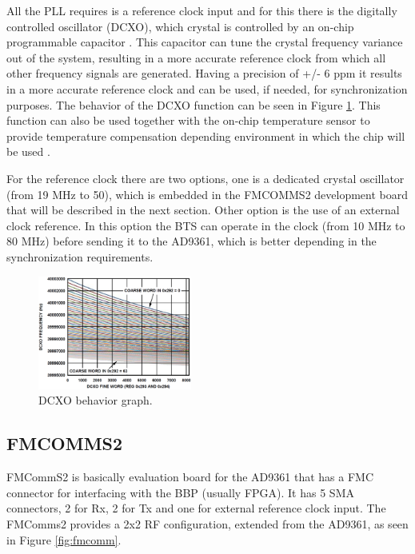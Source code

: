 All the PLL requires is a reference clock input and for this there is the
digitally controlled oscillator (DCXO), which crystal is controlled by an
on-chip programmable capacitor \cite{web:ad9361wiki}. This capacitor can tune
the crystal frequency variance out of the system, resulting in a more accurate
reference clock from which all other frequency signals are generated. Having a
precision of +/- 6 ppm it results in a more accurate reference clock and can be
used, if needed, for synchronization purposes. The behavior of the DCXO function
can be seen in Figure \ref{fig:dcxo}. This function can also be used together
with the on-chip temperature sensor to provide temperature compensation
depending environment in which the chip will be used \cite{ad:ad9361}.

For the reference clock there are two options, one is a dedicated crystal
oscillator (from 19 MHz to 50), which is embedded in the FMCOMMS2 development
board that will be described in the next section. Other option is the use of an
external clock reference. In this option the BTS can operate in the clock (from
10 MHz to 80 MHz) before sending it to the AD9361, which is better depending in
the synchronization requirements.

\begin{figure}[htbp]
    \centering
    \includegraphics[width=0.45\textwidth]{./figures/dcxo_graph}
    \caption{ DCXO behavior graph.
    \label{fig:dcxo}}
\end{figure}


\subsection{FMCOMMS2}
\label{trans:fmcomms2}

FMCommS2 is basically evaluation board for the AD9361 that has a FMC connector
for interfacing with the BBP (usually FPGA). It has 5 SMA connectors, 2 for Rx,
2 for Tx and one for external reference clock input. The FMComms2 provides a 2x2
RF configuration, extended from the AD9361, as seen in Figure \ref{fig:fmcomm}.


